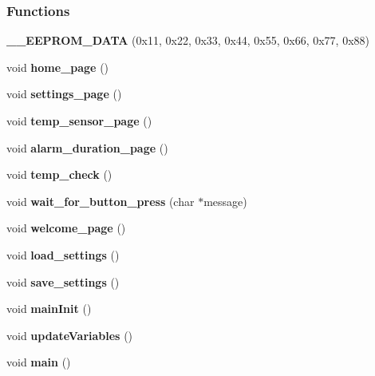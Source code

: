 \subsubsection*{Functions}
\begin{DoxyCompactItemize}
\item 
\textbf{ \+\_\+\+\_\+\+E\+E\+P\+R\+O\+M\+\_\+\+D\+A\+TA} (0x11, 0x22, 0x33, 0x44, 0x55, 0x66, 0x77, 0x88)
\item 
void \textbf{ home\+\_\+page} ()
\item 
void \textbf{ settings\+\_\+page} ()
\item 
void \textbf{ temp\+\_\+sensor\+\_\+page} ()
\item 
void \textbf{ alarm\+\_\+duration\+\_\+page} ()
\item 
void \textbf{ temp\+\_\+check} ()
\item 
void \textbf{ wait\+\_\+for\+\_\+button\+\_\+press} (char $\ast$message)
\item 
void \textbf{ welcome\+\_\+page} ()
\item 
void \textbf{ load\+\_\+settings} ()
\item 
void \textbf{ save\+\_\+settings} ()
\item 
void \textbf{ main\+Init} ()
\item 
void \textbf{ update\+Variables} ()
\item 
void \textbf{ main} ()
\end{DoxyCompactItemize}
